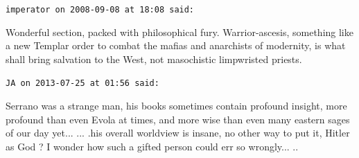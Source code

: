 \begin{footnotesize}
\begin{sffamily}
\texttt{imperator on 2008-09-08 at 18:08 said:}

Wonderful section, packed with philosophical fury. Warrior-ascesis, something like a new Templar order to combat the mafias and anarchists of modernity, is what shall bring salvation to the West, not masochistic limpwristed priests.

\hfill

\texttt{JA on 2013-07-25 at 01:56 said:}

Serrano was a strange man, his books sometimes contain profound insight, more profound than even Evola at times, and more wise than even many eastern sages of our day yet... ... .his overall worldview is insane, no other way to put it, Hitler as God ? I wonder how such a gifted person could err so wrongly... ..


\hfill

\end{sffamily}
\end{footnotesize}

